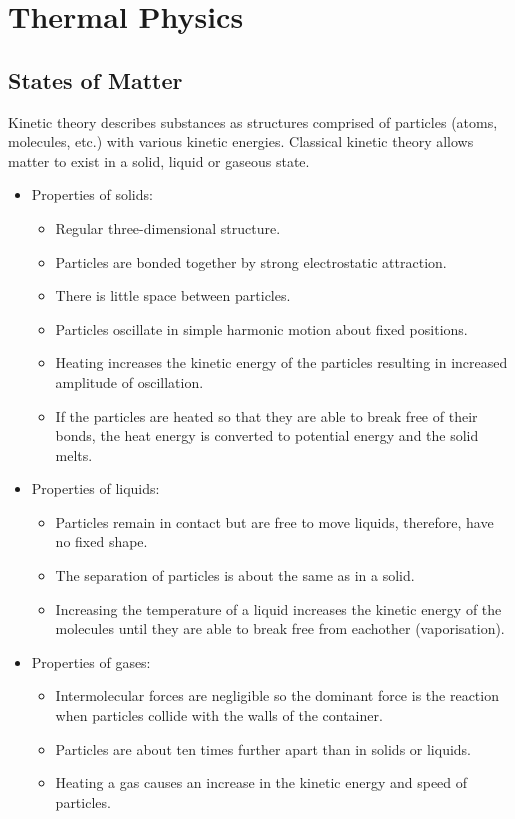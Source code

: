 \documentclass[a4,8pt]{article}
\begin{document}
\section{Thermal Physics}
\subsection{States of Matter}
Kinetic theory describes substances as structures comprised of particles (atoms, molecules, etc.) with various kinetic energies. Classical kinetic theory allows matter to exist in a solid, liquid or gaseous state.

\begin{itemize}
	\item Properties of solids:
		\begin{itemize}
			\item Regular three-dimensional structure.
			\item Particles are bonded together by strong electrostatic attraction.
			\item There is little space between particles.
			\item Particles oscillate in simple harmonic motion about fixed positions.
			\item Heating increases the kinetic energy of the particles resulting in increased amplitude of oscillation.
			\item If the particles are heated so that they are able to break free of their bonds, the heat energy is converted to potential energy and the solid melts.
		\end{itemize}
	\item Properties of liquids:
		\begin{itemize}
			\item Particles remain in contact but are free to move liquids, therefore, have no fixed shape.
			\item The separation of particles is about the same as in a solid.
			\item Increasing the temperature of a liquid increases the kinetic energy of the molecules until they are able to break free from eachother (vaporisation).
		\end{itemize}
	\item Properties of gases:
		\begin{itemize}
			\item Intermolecular forces are negligible so the dominant force is the reaction when particles collide with the walls of the container.
			\item Particles are about ten times further apart than in solids or liquids.
			\item Heating a gas causes an increase in the kinetic energy and speed of particles.
		\end{itemize}
\end{itemize}
\end{document}

